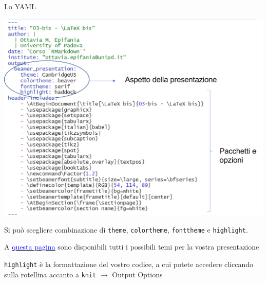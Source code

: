 \documentclass[
  ignorenonframetext,
]{beamer}
\begin{document}
\begin{frame}{Lo YAML}
\protect\hypertarget{lo-yaml-1}{}
\begin{center}\includegraphics[width=0.8\linewidth]{img/yaml1} \end{center}
\end{frame}

\begin{frame}[fragile]{}
\protect\hypertarget{section-6}{}
Si può scegliere combinazione di \texttt{theme}, \texttt{colortheme},
\texttt{fonttheme} e \texttt{highlight}.

A
\href{https://deic.uab.cat/~iblanes/beamer_gallery/}{\textcolor{blue}{questa pagina}}
sono disponibili tutti i possibili temi per la vostra presentazione

\texttt{highlight} è la formattazione del vostro codice, a cui potete
accedere cliccando sulla rotellina accanto a \texttt{knit}
\(\rightarrow\) Output Options
\end{frame}
\end{document}

